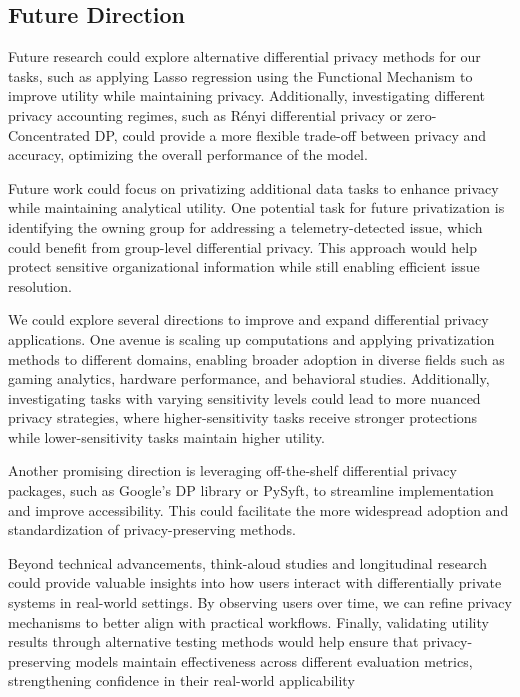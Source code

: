 \documentclass[12pt,letterpaper]{article}
\begin{document}
{\subsection{Future Direction}
Future research could explore alternative differential privacy methods for our tasks, such as applying Lasso regression using the Functional Mechanism to improve utility while maintaining privacy. Additionally, investigating different privacy accounting regimes, such as Rényi differential privacy or zero-Concentrated DP, could provide a more flexible trade-off between privacy and accuracy, optimizing the overall performance of the model. 

Future work could focus on privatizing additional data tasks to enhance privacy while maintaining analytical utility. One potential task for future privatization is identifying the owning group for addressing a telemetry-detected issue, which could benefit from group-level differential privacy. This approach would help protect sensitive organizational information while still enabling efficient issue resolution. 

We could explore several directions to improve and expand differential privacy applications. One avenue is scaling up computations and applying privatization methods to different domains, enabling broader adoption in diverse fields such as gaming analytics, hardware performance, and behavioral studies. Additionally, investigating tasks with varying sensitivity levels could lead to more nuanced privacy strategies, where higher-sensitivity tasks receive stronger protections while lower-sensitivity tasks maintain higher utility.

Another promising direction is leveraging off-the-shelf differential privacy packages, such as Google's DP library or PySyft, to streamline implementation and improve accessibility. This could facilitate the more widespread adoption and standardization of privacy-preserving methods.

Beyond technical advancements, think-aloud studies and longitudinal research could provide valuable insights into how users interact with differentially private systems in real-world settings. By observing users over time, we can refine privacy mechanisms to better align with practical workflows. Finally, validating utility results through alternative testing methods would help ensure that privacy-preserving models maintain effectiveness across different evaluation metrics, strengthening confidence in their real-world applicability


}
\end{document}
